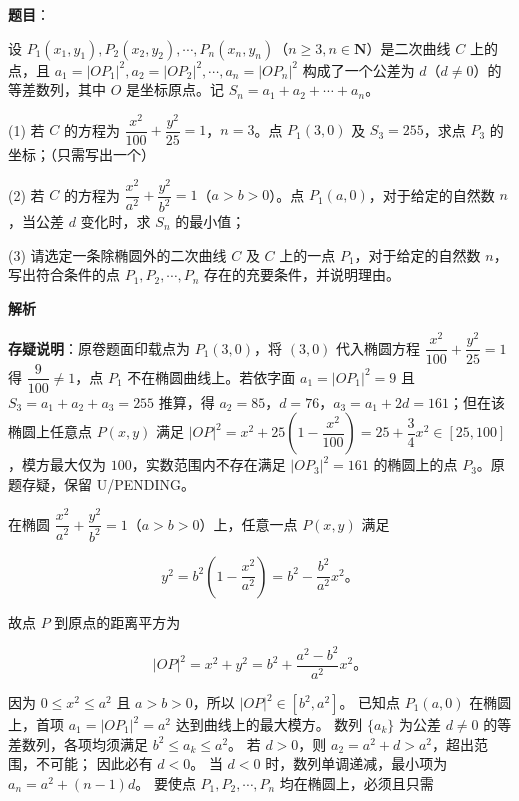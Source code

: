 \begin{answer}

\textbf{题目}：

设 $P_1(x_1, y_1), P_2(x_2, y_2), \cdots, P_n(x_n, y_n)$（$n \geqslant 3, n \in \mathbf{N}$）是二次曲线 $C$ 上的点，且 $a_1 = |OP_1|^2, a_2 = |OP_2|^2, \cdots, a_n = |OP_n|^2$ 构成了一个公差为 $d$（$d \ne 0$）的等差数列，其中 $O$ 是坐标原点。记 $S_n = a_1 + a_2 + \cdots + a_n$。

(1) 若 $C$ 的方程为 $\dfrac{x^2}{100} + \dfrac{y^2}{25} = 1$，$n = 3$。点 $P_1(3, 0)$ 及 $S_3 = 255$，求点 $P_3$ 的坐标；（只需写出一个）

(2) 若 $C$ 的方程为 $\dfrac{x^2}{a^2} + \dfrac{y^2}{b^2} = 1$（$a > b > 0$）。点 $P_1(a, 0)$，对于给定的自然数 $n$，当公差 $d$ 变化时，求 $S_n$ 的最小值；

(3) 请选定一条除椭圆外的二次曲线 $C$ 及 $C$ 上的一点 $P_1$，对于给定的自然数 $n$，写出符合条件的点 $P_1, P_2, \cdots, P_n$ 存在的充要条件，并说明理由。

\textbf{解析}


\begin{gktip}
\textbf{存疑说明}：原卷题面印载点为 $P_1(3, 0)$，将 $(3, 0)$ 代入椭圆方程 $\dfrac{x^2}{100} + \dfrac{y^2}{25} = 1$ 得 $\dfrac{9}{100} \ne 1$，点 $P_1$ 不在椭圆曲线上。若依字面 $a_1 = |OP_1|^2 = 9$ 且 $S_3 = a_1 + a_2 + a_3 = 255$ 推算，得 $a_2 = 85$，$d = 76$，$a_3 = a_1 + 2d = 161$；但在该椭圆上任意点 $P(x, y)$ 满足 $|OP|^2 = x^2 + 25\left(1 - \dfrac{x^2}{100}\right) = 25 + \dfrac{3}{4}x^2 \in [25, 100]$，模方最大仅为 $100$，实数范围内不存在满足 $|OP_3|^2 = 161$ 的椭圆上的点 $P_3$。原题存疑，保留 U/PENDING。
\end{gktip}


在椭圆 $\dfrac{x^2}{a^2} + \dfrac{y^2}{b^2} = 1$（$a > b > 0$）上，任意一点 $P(x, y)$ 满足

\nopagebreak[4]
\[
y^2 = b^2\left(1 - \dfrac{x^2}{a^2}\right) = b^2 - \dfrac{b^2}{a^2}x^2\mbox{。}
\]

故点 $P$ 到原点的距离平方为

\nopagebreak[4]
\[
|OP|^2 = x^2 + y^2 = b^2 + \dfrac{a^2 - b^2}{a^2}x^2\mbox{。}
\]

因为 $0 \leqslant x^2 \leqslant a^2$ 且 $a > b > 0$，所以 $|OP|^2 \in [b^2, a^2]$。
已知点 $P_1(a, 0)$ 在椭圆上，首项 $a_1 = |OP_1|^2 = a^2$ 达到曲线上的最大模方。
数列 $\{a_k\}$ 为公差 $d \ne 0$ 的等差数列，各项均须满足 $b^2 \leqslant a_k \leqslant a^2$。
若 $d > 0$，则 $a_2 = a^2 + d > a^2$，超出范围，不可能；
因此必有 $d < 0$。
当 $d < 0$ 时，数列单调递减，最小项为 $a_n = a^2 + (n - 1)d$。
要使点 $P_1, P_2, \cdots, P_n$ 均在椭圆上，必须且只需


\end{answer}
